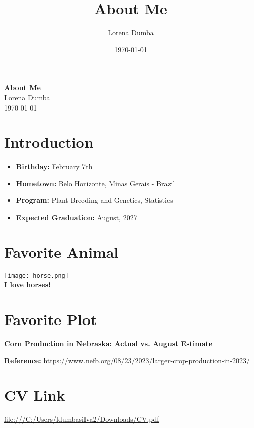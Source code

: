\documentclass{article}
\title{About Me}
\author{Lorena Dumba}
\date{\today}
\begin{document}
\begin{center}
    \huge{\textbf{About Me}}\\
    \vspace{1cm}
    \Large{Lorena Dumba}\\
    \vspace{0.5cm}
    \large{\today}
\end{center}
\newpage

\section*{Introduction}
\begin{itemize}
    \item \textbf{Birthday:} February 7th
    \item \textbf{Hometown:} Belo Horizonte, Minas Gerais - Brazil
    \item \textbf{Program:} Plant Breeding and Genetics, Statistics
    \item \textbf{Expected Graduation:} August, 2027
\end{itemize}
\newpage

\section*{Favorite Animal}
\begin{center}
    \texttt{[image: horse.png]}\\
    \vspace{0.5cm}
    \textbf{I love horses!}
\end{center}
\newpage

\section*{Favorite Plot}

\begin{center}
    \textbf{Corn Production in Nebraska: Actual vs. August Estimate}
\end{center}

\begin{figure}[h!]
    \centering
\end{figure}

\begin{center}
    \textbf{Reference:} \url{https://www.nefb.org/08/23/2023/larger-crop-production-in-2023/}
\end{center}
\newpage

\section*{CV Link}
\begin{center}
    \href{View CV}\url{file:///C:/Users/ldumbasilva2/Downloads/CV.pdf}
\end{center}
\end{document}
